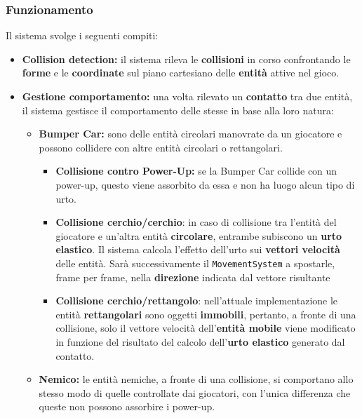 \subsubsection{Funzionamento}
Il sistema svolge i seguenti compiti: 
\begin{itemize}
    \item \textbf{Collision detection:} il sistema rileva le \textbf{collisioni} in corso confrontando le \textbf{forme} e le \textbf{coordinate} sul piano cartesiano delle \textbf{entità} attive nel gioco. 
    \item \textbf{Gestione comportamento:} una volta rilevato un \textbf{contatto} tra due entità, il sistema gestisce il comportamento delle stesse in base alla loro natura: 
        \begin{itemize}

            \item \textbf{Bumper Car:} sono delle entità circolari manovrate da un giocatore e possono collidere con altre entità circolari o rettangolari. 
                \begin{itemize}
                    \item \textbf{Collisione contro Power-Up:} se la Bumper Car collide con un power-up, questo viene assorbito da essa e non ha luogo alcun tipo di urto. 
                    
                    \item \textbf{Collisione cerchio/cerchio}: in caso di collisione tra l'entità del giocatore e un'altra entità \textbf{circolare}, entrambe subiscono un \textbf{urto elastico}. Il sistema calcola l'effetto dell'urto sui \textbf{vettori velocità} delle entità. Sarà successivamente il \texttt{MovementSystem} a spostarle, frame per frame, nella \textbf{direzione} indicata dal vettore risultante
                    
                    \item \textbf{Collisione cerchio/rettangolo}: nell'attuale implementazione le entità \textbf{rettangolari} sono oggetti \textbf{immobili}, pertanto, a fronte di una collisione, solo il vettore velocità dell'\textbf{entità mobile} viene modificato in funzione del risultato del calcolo dell'\textbf{urto elastico} generato dal contatto. 
                    
                \end{itemize}
            
            \item \textbf{Nemico:} le entità nemiche, a fronte di una collisione, si comportano allo stesso modo di quelle controllate dai giocatori, con l'unica differenza che queste non possono assorbire i power-up. 
            

\end{itemize}
\end{itemize}
